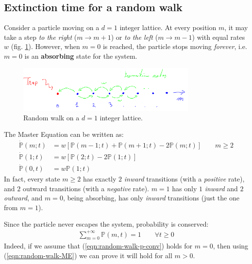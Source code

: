 \documentclass[../../main.tex]{subfiles}
\begin{document}
\subsection{Extinction time for a random walk} %
Consider a particle moving on a $d=1$ integer lattice. At every position $m$, it may take a step \textit{to the right} ($m \to m+1$) or \textit{to the left} ($m \to m-1$) with equal rates $w$ (fig. \ref{fig:random_walk_mc}). However, when $m=0$ is reached, the particle stops moving \textit{forever}, i.e. $m=0$ is an \textbf{absorbing} state for the system.

\begin{figure}[H]
    \centering
    \includegraphics[width=0.8\textwidth]{random_walk_mc.png}
    \caption{Random walk on a $d=1$ integer lattice.}
    \label{fig:random_walk_mc}
\end{figure}

The Master Equation can be written as:
\begin{align}\label{eqn:random-walk-ME}
    \dot{\mathbb{P}}(m;t) &= w[\mathbb{P}(m-1;t) + \mathbb{P}(m+1;t) - 2 \mathbb{P}(m;t)] \qquad m \geq 2\\ \nonumber
    \dot{\mathbb{P}}(1;t) &= w[\mathbb{P}(2;t) - 2\mathbb{P}(1;t)]\\ \nonumber
    \dot{\mathbb{P}}(0,t) &= w \mathbb{P}(1;t)
\end{align}
In fact, every state $m \geq 2$ has exactly $2$ \textit{inward} transitions (with a \textit{positive} rate), and $2$ outward transitions (with a \textit{negative} rate). $m=1$ has only $1$ \textit{inward} and $2$ \textit{outward}, and $m=0$, being absorbing, has only \textit{inward} transitions (just the one from $m=1$).

\medskip

Since the particle never escapes the system, probability is conserved:
\begin{align}\label{eqn:random-walk-p-conv}
    \sum_{m=0}^{+\infty} \mathbb{P}(m,t) = 1 \qquad \forall t \geq 0
\end{align}
Indeed, if we assume that (\ref{eqn:random-walk-p-conv}) holds for $m=0$, then using (\ref{eqn:random-walk-ME}) we can prove it will hold for all $m > 0$.
\end{document}
